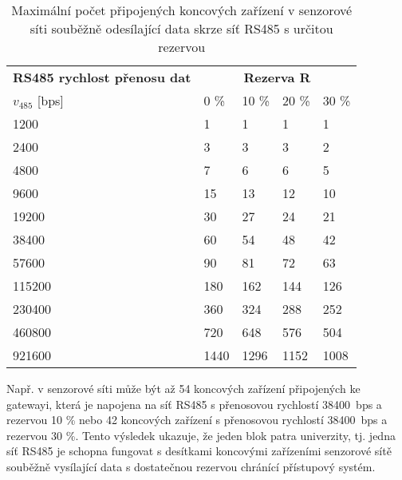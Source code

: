 \begin{longtable} {|l|llll|}
\caption{Maximální počet připojených koncových zařízení v senzorové síti souběžně odesílající data skrze síť RS485 s určitou    
    rezervou}      \label{tab:max-sensor-nodes} \\
    \hline

    \textbf{RS485 rychlost přenosu dat} &       \multicolumn{4}{c|}{\textbf{Rezerva R}}	  	    \\

    $v_{485}$ {[bps]}  &	0 \%	&	10 \%	&	20 \%	&	30 \%  \\ \hline

    1200~~~ &    1	&    1	&    1	&    1 \\
    2400~~~ &    3	&    3	&    3	&    2 \\
    4800~~~ &    7	&    6	&    6	&    5 \\
    9600~~~ &   15	&   13	&   12	&   10 \\
    19200~~~ &   30	&   27	&   24	&   21 \\
    38400~~~ &   60	&   54	&   48	&   42 \\
    57600~~~ &   90	&   81	&   72	&   63 \\
    115200~~~ &  180	&  162	&  144	&  126 \\
    230400~~~ &  360	&  324	&  288	&  252 \\
    460800~~~ &  720	&  648	&  576	&  504 \\
    921600~~~ & 1440	& 1296	& 1152	& 1008 \\
    \hline

\end{longtable}


Např. v senzorové síti může být až 54 koncových zařízení připojených ke gatewayi, která je napojena na síť RS485 s přenosovou rychlostí 38400~bps a rezervou 10 \% nebo 42 koncových zařízení s přenosovou rychlostí 38400~bps a rezervou 30 \%.
Tento výsledek ukazuje, že jeden blok patra univerzity, tj. jedna síť RS485 je schopna fungovat s desítkami koncovými zařízeními senzorové sítě souběžně vysílající data s dostatečnou rezervou chránící přístupový systém. 








